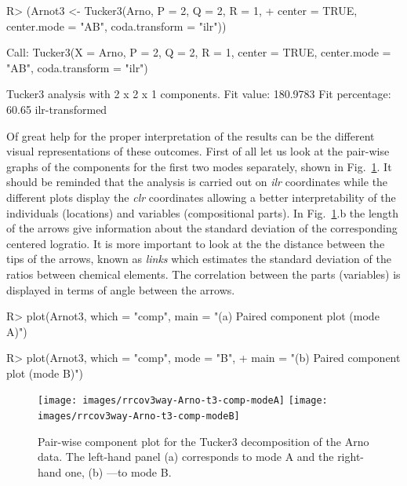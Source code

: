 \documentclass[article,shortnames, nojss]{jss}
\begin{document}
\begin{Schunk}
\begin{Sinput}
R> (Arnot3 <- Tucker3(Arno, P = 2, Q = 2, R = 1,
+      center = TRUE, center.mode = "AB", coda.transform = "ilr"))
\end{Sinput}
\begin{Soutput}
Call:
Tucker3(X = Arno, P = 2, Q = 2, R = 1, center = TRUE, center.mode = "AB", 
    coda.transform = "ilr")


Tucker3 analysis with  2 x 2 x 1  components.
Fit value: 180.9783 
Fit percentage: 60.65 %
ilr-transformed
\end{Soutput}
\end{Schunk}

Of great help for the proper interpretation of the results can be the different
visual representations of these outcomes. First of all let us look at the pair-wise
graphs of the components for the first two modes separately, shown in
Fig.~\ref{fig-Arno-t3-comp-pair-wise}.
It should be reminded that the analysis is carried out
on \textit{ilr} coordinates while the different plots display the \textit{clr}
coordinates allowing a better interpretability of the individuals (locations)
and variables (compositional parts). In Fig.~\ref{fig-Arno-t3-comp-pair-wise}.b
the length of the arrows give information about the standard
deviation of the corresponding centered logratio. It is more important to look at the
the distance between the tips of the arrows, known as \emph{links} which estimates
the standard deviation of the ratios between chemical elements. The correlation
between the parts (variables) is displayed in terms of angle between the arrows.

\begin{Schunk}
\begin{Sinput}
R> plot(Arnot3, which = "comp", main = "(a) Paired component plot (mode A)")
\end{Sinput}
\end{Schunk}
\begin{Schunk}
\begin{Sinput}
R> plot(Arnot3, which = "comp", mode = "B",
+      main = "(b) Paired component plot (mode B)")
\end{Sinput}
\end{Schunk}

\begin{figure}[H]
\centering
\texttt{[image: images/rrcov3way-Arno-t3-comp-modeA]}
\texttt{[image: images/rrcov3way-Arno-t3-comp-modeB]}
\caption{Pair-wise component plot for the Tucker3 decomposition of the Arno data.
The left-hand panel (a) corresponds to mode A and the right-hand one, (b) ---to mode B.}
\label{fig-Arno-t3-comp-pair-wise}
\end{figure}
\end{document}
